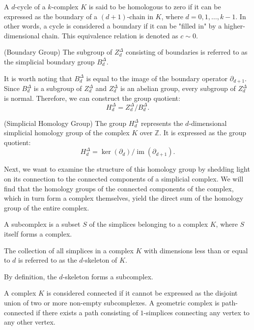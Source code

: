 A $d$-cycle of a $k$-complex $K$ is said to be homologous to zero if it can be expressed as the boundary of a $(d+1)$-chain in $K$, where $d = 0, 1, \ldots, k-1$. In other words, a cycle is considered a boundary if it can be "filled in" by a higher-dimensional chain. This equivalence relation is denoted as $c \sim 0$.

\begin{definition}
    {(Boundary Group) \cite[\S 2.3]{zomorodian2004computing}} The subgroup of $Z^{\Delta}_d$ consisting of boundaries is referred to as the simplicial boundary group $B^{\Delta}_d$.
\end{definition}

It is worth noting that $B^{\Delta}_d$ is equal to the image of the boundary operator $\partial_{d+1}$. Since $B^{\Delta}_d$ is a subgroup of $Z^{\Delta}_d$ and $Z^{\Delta}_d$ is an abelian group, every subgroup of $Z^{\Delta}_d$ is normal. Therefore, we can construct the group quotient:
\[
    H^{\Delta}_d = Z^{\Delta}_d / B^{\Delta}_d.
\]

\begin{definition}
    {(Simplicial Homology Group) \cite[\S 2.1]{hatcher2005algebraic}} The group $H^{\Delta}_d$ represents the $d$-dimensional simplicial homology group of the complex $K$ over $\mathbb{Z}$. It is expressed as the group quotient:
    \[
        H^{\Delta}_d = \ker(\partial_d) / \operatorname{im}(\partial_{d+1}).
    \]
\end{definition}

Next, we want to examine the structure of this homology group by shedding light on its connection to the connected components of a simplicial complex. We will find that the homology groups of the connected components of the complex, which in turn form a complex themselves, yield the direct sum of the homology group of the entire complex.

\begin{definition}
    A subcomplex is a subset $S$ of the simplices belonging to a complex $K$, where $S$ itself forms a complex.
\end{definition}

\begin{definition}
    The collection of all simplices in a complex $K$ with dimensions less than or equal to $d$ is referred to as the $d$-skeleton of $K$.
\end{definition}

By definition, the $d$-skeleton forms a subcomplex.

\begin{definition}
    A complex $K$ is considered connected if it cannot be expressed as the disjoint union of two or more non-empty subcomplexes. A geometric complex is path-connected if there exists a path consisting of $1$-simplices connecting any vertex to any other vertex.
\end{definition}

